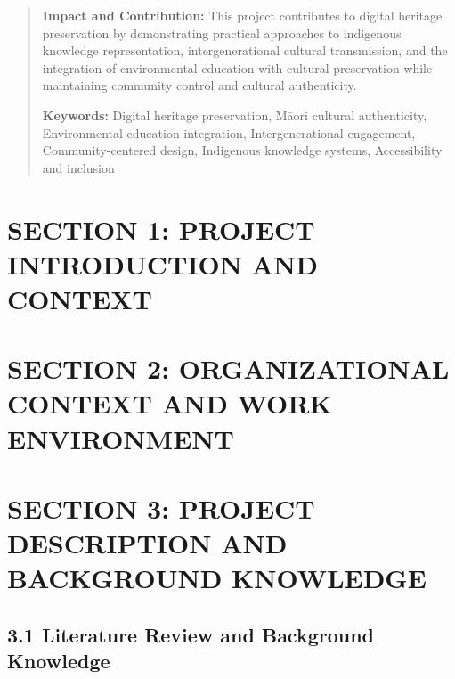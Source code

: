 \documentclass[12pt,a4paper]{article}
\begin{document}
\begin{abstract}
\textbf{Impact and Contribution:} This project contributes to digital heritage preservation by demonstrating practical approaches to indigenous knowledge representation, intergenerational cultural transmission, and the integration of environmental education with cultural preservation while maintaining community control and cultural authenticity.

\textbf{Keywords:} Digital heritage preservation, Māori cultural authenticity, Environmental education integration, Intergenerational engagement, Community-centered design, Indigenous knowledge systems, Accessibility and inclusion
\end{abstract}

\newpage
\tableofcontents

\newpage
\listoffigures

\newpage
\listoftables

\newpage
\section*{SECTION 1: PROJECT INTRODUCTION AND CONTEXT}


\newpage
\section*{SECTION 2: ORGANIZATIONAL CONTEXT AND WORK ENVIRONMENT}


\newpage
\section*{SECTION 3: PROJECT DESCRIPTION AND BACKGROUND KNOWLEDGE}

\subsection*{3.1 Literature Review and Background Knowledge}

\end{document}
